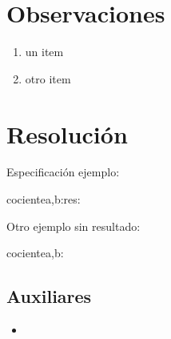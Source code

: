 \documentclass[10pt,a4paper,spanish]{article}
\begin{document}


\maketitle

\newpage


\clearpage

% 

\section{Observaciones}

	\begin{enumerate}
		\item un item
		\item otro item
	\end{enumerate}


\section{Resolución}

\begin{ejercicio}
	Especificación ejemplo:

	\begin{problema}{cociente}{a,b:\ent}{res:\ent}
	\end{problema}

\end{ejercicio}

\begin{ejercicio}
	Otro ejemplo sin resultado:
	
	\begin{problema*}{cociente}{a,b:\ent}
	\end{problema*}

\end{ejercicio}


\subsection{Auxiliares}

\begin{itemize}
	\item \auxil{inversa(a:\TLista{T}) : \TLista{T}}{[a_{|a|-i-1}\ |\ i \selec [0 \twodots \longitud{a})]}
\end{itemize}
        
\end{document}
